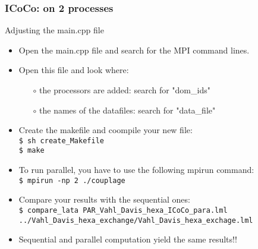 \documentclass[10pt, hyperref={unicode=true,pdfusetitle, bookmarks=true,bookmarksnumbered=false,bookmarksopen=false, breaklinks=false,pdfborder={0 0 1},backref=true,colorlinks=true,linkcolor=darkblue,pageanchor, urlcolor=darkblue}]{beamer}
\begin{document}
\begin{frame}
\frametitle{ICoCo: on 2 processes}
\begin{block}{Adjusting the main.cpp file}

\begin{itemize}
\item Open the main.cpp file and search for the MPI command lines.
\item Open this file and look where:
    \begin{itemize}
    \item [$\circ$] the processors are added: search for "dom\_ids"
    \item [$\circ$] the names of the datafiles: search for "data\_file"
    \end{itemize}

\item Create the makefile and coompile your new file:\\
\texttt{\$ sh create\_Makefile}\\
\texttt{\$ make}\\
\item To run parallel, you have to use the following mpirun command:\\
\texttt{\$ mpirun -np 2 ./couplage}\\

\item Compare your results with the sequential ones:\\
\texttt{\$ compare\_lata PAR\_Vahl\_Davis\_hexa\_ICoCo\_para.lml ../Vahl\_Davis\_hexa\_exchange/Vahl\_Davis\_hexa\_exchage.lml}\\
\item Sequential and parallel computation yield the same results!!
\end{itemize}

\end{block}
\end{frame}
\end{document}
